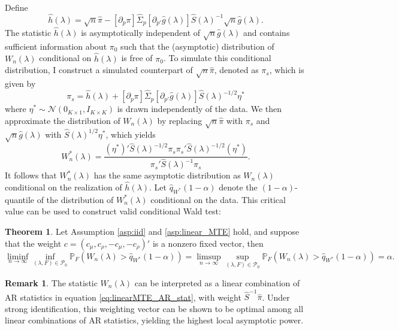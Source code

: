 \documentclass[11pt]{article}
\theoremstyle{definition}
\newtheorem{theorem}{Theorem}[section]
\newtheorem{remark}{Remark}[section]
\newcommand{\Prob}{\ensuremath{\mathbb{P}}} %
\newcommand{\0}{\ensuremath{\mathbf{0}}}
\newcommand{\normal}{\ensuremath{\mathcal{N}}}
\begin{document}
\begin{bibunit}
Define 
\[
    \hat{h}(\lambda) = \sqrt{n}\hat{\pi} - [\partial_{p} {\pi}]\hat{\Sigma}_p [\partial_{p'} \hat{g}(\lambda)] \hat{S}(\lambda)^{-1} \sqrt{n}\hat{g}(\lambda).
\]
The statistic $\hat{h}(\lambda)$ is asymptotically independent of $\sqrt{n}\hat{g}(\lambda)$ and contains sufficient information about $\pi_0$ such that the (asymptotic) distribution of $W_n(\lambda)$ conditional on $\hat{h}(\lambda)$ is free of $\pi_0$. To simulate this conditional distribution, I construct a simulated counterpart of $\sqrt{n}\hat{\pi}$, denoted as ${\pi}_s$, which is given by
\[
	{\pi}_s = \hat{h}(\lambda) + [\partial_{p} {\pi}]\hat{\Sigma}_p [\partial_{p'} \hat{g}(\lambda)] \hat{S}(\lambda)^{-1/2}\eta^*
\]
where $\eta^* \sim \normal(0_{K\times 1},I_{K\times K})$ is drawn independently of the data. We then approximate the distribution of $W_n(\lambda)$ by replacing $\sqrt{n}\hat{\pi}$ with ${\pi}_s$ and $\sqrt{n}\hat{g}(\lambda)$ with $\hat{S}(\lambda)^{1/2}\eta^*$, which yields
\[
	W_n^*(\lambda) = \frac{(\eta^*)'\hat{S}(\lambda)^{-1/2}\pi_s\pi_s'\hat{S}(\lambda)^{-1/2}(\eta^*)}{\pi_s'\hat{S}(\lambda)^{-1}\pi_s}.
\]
It follows that $W_n^*(\lambda)$ has the same asymptotic distribution as $W_n(\lambda)$ conditional on the realization of $\hat{h}(\lambda)$. Let $\hat{q}_{W^*}(1-\alpha)$ denote the $(1-\alpha)$-quantile of the distribution of $W_n^*(\lambda)$ conditional on the data. This critical value can be used to construct valid conditional Wald test:
\begin{theorem}
\label{thm:validity_cond_wald}
Let Assumption \ref{asp:iid} and \ref{asp:linear_MTE} hold, and suppose that the weight $c = (c_\mu, c_\rho, -c_\mu, -c_\rho)'$ is a nonzero fixed vector, then 
\[
	\liminf_{n\to\infty}\inf_{(\lambda,F)\in\mathcal{P}_0} \Prob_{F}\left(W_n(\lambda) > \hat{q}_{W^*}(1-\alpha)\right) = \limsup_{n\to\infty}\sup_{(\lambda,F)\in\mathcal{P}_0} \Prob_{F}\left(W_n(\lambda) > \hat{q}_{W^*}(1-\alpha)\right) = \alpha.
\]
\end{theorem}

\begin{remark}
    The statistic $W_n(\lambda)$ can be interpreted as a linear combination of AR statistics in equation \eqref{eq:linearMTE_AR_stat}, with weight 
    $\hat{S}^{-1}\hat{\pi}$. Under strong identification, this weighting vector can be shown to be optimal among all linear combinations of AR statistics, yielding the highest local asymptotic power. %
\end{remark}


\end{bibunit}
\end{document}
